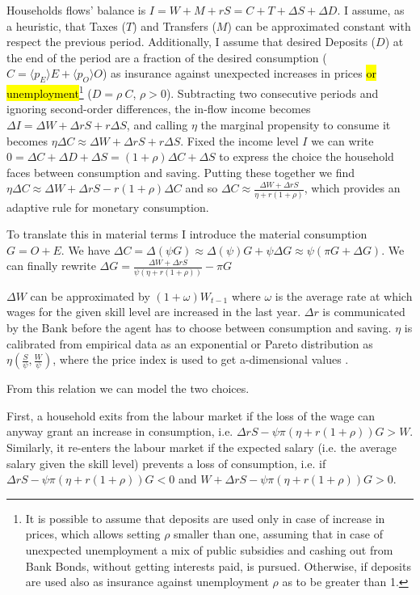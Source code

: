 \documentclass[a4paper, headings=standardclasses]{scrartcl}
\begin{document}
Households flows' balance is $I = W + M + rS = C + T + \Delta S + \Delta D$.
I assume, as a heuristic, that Taxes ($T$) and Transfers ($M$) can be approximated constant with respect the previous period.
Additionally, I assume that desired Deposits ($D$) at the end of the period are a fraction of the desired consumption ($C = \langle p_E \rangle E + \langle p_O \rangle O$) as insurance against unexpected increases in prices \hl{or unemployment}\footnote{It is possible to assume that deposits are used only in case of increase in prices, which allows setting $\rho$ smaller than one, assuming that in case of unexpected unemployment a mix of public subsidies and cashing out from Bank Bonds, without getting interests paid, is pursued. Otherwise, if deposits are used also as insurance against unemployment $\rho$ as to be greater than 1.} ($D = \rho~C$, $\rho > 0$).
Subtracting two consecutive periods and ignoring second-order differences, the in-flow income becomes $\Delta I = \Delta W + \Delta r S + r \Delta S$, and calling $\eta$ the marginal propensity to consume it becomes $\eta \Delta C \approx \Delta W + \Delta r S + r \Delta S$.
Fixed the income level $I$ we can write $0 = \Delta C + \Delta D + \Delta S = (1+\rho) \Delta C + \Delta S$ to express the choice the household faces between consumption and saving.
Putting these together we find $\eta \Delta C \approx \Delta W + \Delta r S - r (1+\rho) \Delta C$ and so $\Delta C \approx \frac{\Delta W + \Delta r S}{\eta + r (1+\rho)}$, which provides an adaptive rule for monetary consumption.

To translate this in material terms I introduce the material consumption $G = O + E$. We have $\Delta C = \Delta (\psi G) \approx \Delta(\psi) G + \psi \Delta G \approx \psi (\pi G + \Delta G)$. We can finally rewrite $\Delta G = \frac{\Delta W + \Delta r S}{\psi (\eta + r (1+\rho))} - \pi G$

$\Delta W$ can be approximated by $(1 + \omega) W_{t-1}$ where $\omega$ is the average rate at which wages for the given skill level are increased in the last year. $\Delta r$ is communicated by the Bank before the agent has to choose between consumption and saving. $\eta$ is calibrated from empirical data as an exponential or Pareto distribution as $\eta(\frac{S}{\psi},\frac{W}{\psi})$, where the price index is used to get a-dimensional values \parencite{fisher2020,carroll2017}.

From this relation we can model the two choices.

First, a household exits from the labour market if the loss of the wage can anyway grant an increase in consumption, i.e. $\Delta r S - \psi \pi (\eta + r (1+\rho)) G > W$. Similarly, it re-enters the labour market if the expected salary (i.e. the average salary given the skill level) prevents a loss of consumption, i.e. if $\Delta r S - \psi \pi (\eta + r (1+\rho)) G < 0$ and $W + \Delta r S - \psi \pi (\eta + r (1+\rho)) G > 0$.
\end{document}
